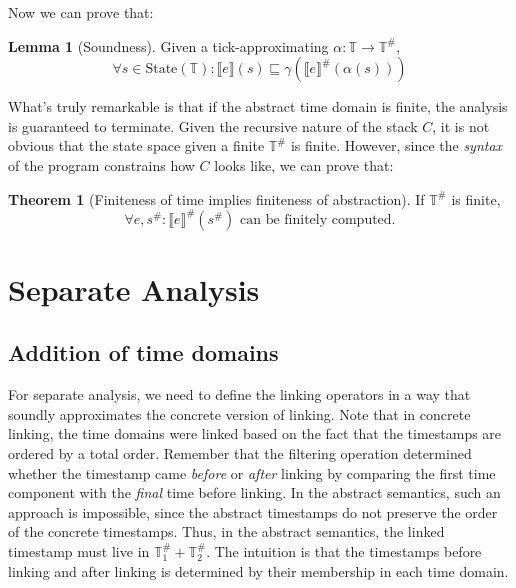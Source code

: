 \documentclass[acmsmall,review]{acmart}\settopmatter{printfolios=true,printccs=false,printacmref=false}
\theoremstyle{definition}
\newtheorem{lem}{Lemma}[section]
\newtheorem{thm}{Theorem}[section]
\newcommand*{\A}[1]{{#1}^{\#}}
\newcommand*{\Time}{\mathbb{T}}
\newcommand*{\ATime}{\A{\Time}}
\newcommand*{\State}[1]{\text{State}({#1})}
\newcommand*{\sembracket}[1]{\lBrack{#1}\rBrack}
\begin{document}
Now we can prove that:
\begin{lem}[Soundness]
  Given a tick-approximating $\alpha:\Time\rightarrow\ATime$,
  \[
    \forall s\in\State{\Time}:\sembracket{e}(s)\sqsubseteq\gamma(\A{\sembracket{e}}(\alpha(s)))
  \]
\end{lem}

What's truly remarkable is that if the abstract time domain is finite, the analysis is guaranteed to terminate.
Given the recursive nature of the stack $C$, it is not obvious that the state space given a finite $\ATime$ is finite.
However, since the \emph{syntax} of the program constrains how $C$ looks like, we can prove that:

\begin{thm}[Finiteness of time implies finiteness of abstraction]
  If $\ATime$ is finite,
  \[
    \forall e,\A{s}: \A{\sembracket{e}}(\A{s})\text{ can be finitely computed.}
  \]
\end{thm}

\section{Separate Analysis}

\subsection{Addition of time domains}
For separate analysis, we need to define the linking operators in a way that soundly approximates the concrete version of linking.
Note that in concrete linking, the time domains were linked based on the fact that the timestamps are ordered by a total order.
Remember that the filtering operation determined whether the timestamp came \emph{before} or \emph{after} linking by comparing the first time component with the \emph{final} time before linking.
In the abstract semantics, such an approach is impossible, since the abstract timestamps do not preserve the order of the concrete timestamps.
Thus, in the abstract semantics, the linked timestamp must live in $\ATime_1+\ATime_2$.
The intuition is that the timestamps before linking and after linking is determined by their membership in each time domain.
\end{document}
